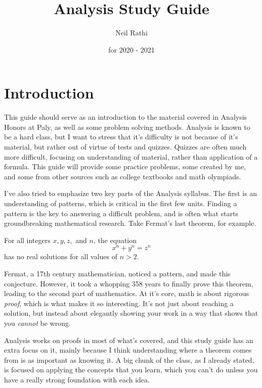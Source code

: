 \documentclass[11pt]{article}
\title{Analysis Study Guide}
\author{Neil Rathi}
\date{for 2020 - 2021}
\begin{document}

\maketitle

\tableofcontents

\newpage

\section{Introduction}
This guide should serve as an introduction to the material covered in Analysis Honors at Paly, as well as some problem solving methods. Analysis is known to be a hard class, but I want to stress that it's difficulty is not because of it's material, but rather out of virtue of tests and quizzes. Quizzes are often much more difficult, focusing on understanding of material, rather than application of a formula. This guide will provide some practice problems, some created by me, and some from other sources such as college textbooks and math olympiads.

I've also tried to emphasize two key parts of the Analysis syllabus. The first is an understanding of patterns, which is critical in the first few units. Finding a pattern is the key to answering a difficult problem, and is often what starts groundbreaking mathematical research. Take Fermat's last theorem, for example.

\begin{thrm}
    For all integers $x, y,z,$ and $n$, the equation
    \[x^n + y^n = z^n\]
    has no real solutions for all values of $n > 2$.
\end{thrm}
Fermat, a 17th century mathematician, noticed a pattern, and made this conjecture. However, it took a whopping 358 years to finally prove this theorem, leading to the second part of mathematics. At it's core, math is about rigorous \textit{proof}, which is what makes it so interesting. It's not just about reaching a solution, but instead about elegantly showing your work in a way that shows that you \textit{cannot} be wrong.

Analysis works on proofs in most of what's covered, and this study guide has an extra focus on it, mainly because I think understanding where a theorem comes from is as important as knowing it. A big chunk of the class, as I already stated, is focused on applying the concepts that you learn, which you can't do unless you have a really strong foundation with each idea.
\end{document}
